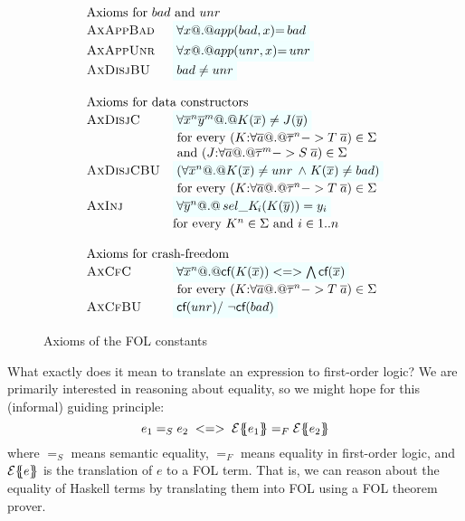 \begin{figure}\small
\setlength{\arraycolsep}{1pt}
\[\begin{array}{c}
\begin{array}{ll}
\multicolumn{2}{l}{\text{Axioms for $bad$ and $unr$}} \\
 \textsc{AxAppBad}  & \formula{\forall x @.@ app(\bad,x){=}\bad}  \\
 \textsc{AxAppUnr}  & \formula{\forall x @.@ app(\unr,x){=}\unr}    \\
 \textsc{AxDisjBU} & \formula{\bad \neq \unr}  \\
\\
\multicolumn{2}{l}{\mbox{Axioms for data constructors}} \\
 \textsc{AxDisjC} & \formula{\forall \oln{x}{n}\oln{y}{m} @.@ K(\ol{x}) \neq J(\ol{y})} \\
                  & \text{ for every } (K{:}\forall\as @.@ \oln{\tau}{n} -> T\;\as) \in \Sigma \\
                  & \text{ and } (J{:}\forall\as @.@ \oln{\tau}{m} -> S\;\as) \in \Sigma \\
 \textsc{AxDisjCBU} & \formula{(\forall \oln{x}{n} @.@ K(\ol{x}) \neq \unr \; \land \; K(\ol{x}) \neq \bad)} \\
                  & \text{ for every } (K{:}\forall\as @.@ \oln{\tau}{n} -> T\;\as) \in \Sigma \\
 \textsc{AxInj}   & \formula{\forall \oln{y}{n} @.@ \sel{K}{i}(K(\ys)) = y_i} \\
                  & \text{for every } K^\ar \in \Sigma \text{ and } i \in 1..n \\
\\
\multicolumn{2}{l}{\mbox{Axioms for crash-freedom}} \\
 \textsc{AxCfC}  & \formula{\forall \oln{x}{n} @.@ \lcf{K(\ol{x})} <=> \bigwedge\lcf{\ol{x}}} \\
                 & \text{ for every } (K{:}\forall\as @.@ \oln{\tau}{n} -> T\;\as) \in \Sigma \\
 \textsc{AxCfBU} & \formula{\lcf{\unr} /\ \lncf{\bad}} \\
\end{array}
\end{array}\]
\caption{Axioms of the FOL constants}\label{fig:prelude} \label{fig:data-cons}
\end{figure}

What exactly does it mean to translate an expression to first-order logic?
We are primarily interested in reasoning about equality, so we might
hope for this (informal) guiding principle:
$$
e_1 =_S e_2 \;<=>\; \etrans{}{}{e_1} =_F \etrans{}{}{e_2}
$$
where $=_S$ means semantic equality, $=_F$ means equality in first-order logic,
and ${\cal E}\{\!\!\{e\}\!\!\}$ is the translation of $e$ to a FOL term. That is, we can
reason about the equality of Haskell terms by translating them into FOL using
a FOL theorem prover. 

